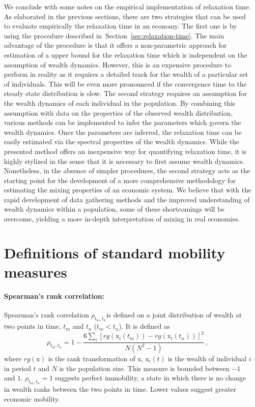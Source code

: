\documentclass[11pt]{article}
\newcommand{\Sref}[1]{Section~\ref{sec:#1}}
\newcommand{\be}{\begin{equation}}
\newcommand{\ee}{\end{equation}}
\numberwithin{equation}{section}
\begin{document}
We conclude with some notes on the empirical implementation of relaxation time. As elaborated in the previous sections, there are two strategies that can be used to evaluate empirically the relaxation time in an economy. The first one is by using the procedure described in~\Sref{relaxation-time}. The main advantage of the procedure is that it offers a non-parametric approach for estimation of a upper bound for the relaxation time which is independent on the assumption of wealth dynamics. However, this is an expensive procedure to perform in reality as it requires a detailed track for the wealth of a particular set of individuals. This will be even more pronounced if the convergence time to the steady state distribution is slow. The second strategy requires an assumption for the wealth dynamics of each individual in the population. By combining this assumption with data on the properties of the observed wealth distribution, various methods can be implemented to infer the parameters which govern the wealth dynamics. Once the parameters are inferred, the relaxation time can be easily estimated via the spectral properties of the wealth dynamics. While the presented method offers an inexpensive way for quantifying relaxation time, it is highly stylized in the sense that it is necessary to first assume wealth dynamics. Nonetheless, in the absence of simpler procedures, the second strategy acts as the starting point for the development of a more comprehensive methodology for estimating the mixing properties of an economic system. We believe that with the rapid development of data gathering methods and the improved understanding of wealth dynamics within a population, some of these shortcomings will be overcome, yielding a more in-depth interpretation of mixing in real economies.


%

\clearpage

\appendix

\section{Definitions of standard mobility measures}\label{sec:standard-mobility-measures}

\paragraph{Spearman's rank correlation:} Spearman's rank correlation $\rho_{t_m,t_n}$is defined on a joint distribution of wealth at two points in time, $t_m$ and $t_n$ ($t_m < t_n$). It is defined as
%
\be
    \rho_{t_m,t_n} = 1 - \frac{6\sum_i \left[rg\left(\mathrm{x}_i\left(t_m\right)\right) - rg\left(\mathrm{x}_i\left(t_n\right)\right)\right]^2}{N\left(N^2-1\right)}\,,
\ee
%
where $rg(\mathrm{x})$ is the rank transformation of $\mathrm{x}$, $\mathrm{x}_i(t)$ is the wealth of individual $i$ in period $t$ and $N$ is the population size. This measure is bounded between $-1$ and $1$. $\rho_{t_m,t_n} = 1$ suggests perfect immobility, a state in which there is no change in wealth ranks between the two points in time. Lower values suggest greater economic mobility.
\end{document}
